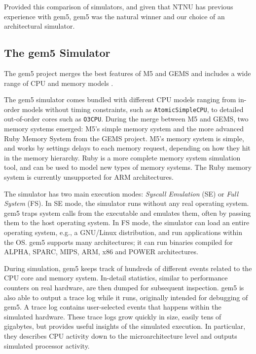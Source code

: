 Provided this comparison of simulators, and given that NTNU has previous
experience with gem5, gem5 was the natural winner and our choice of an
architectural simulator.


\subsection{The gem5 Simulator}

The gem5 project \cite{gem5} merges the best features of M5 \cite{binkert2006m5}
and GEMS \cite{GEMS} and includes a wide range of CPU and memory models
\cite{gem5hipeac}.

The gem5 simulator comes bundled with different CPU models ranging from in-order
models without timing constraints, such as \texttt{AtomicSimpleCPU}, to detailed
out-of-order cores such as \texttt{O3CPU}. During the merge between M5 and GEMS,
two memory systems emerged: M5's simple memory system and the more advanced Ruby
Memory System from the GEMS project. M5's memory system is simple, and works by
settings delays to each memory request, depending on how they hit in the memory
hierarchy. Ruby is a more complete memory system simulation tool, and can be
used to model new types of memory systems. The Ruby memory system is currently
unsupported for ARM architectures.

The simulator has two main execution modes: \textit{Syscall
Emulation} (SE) or \textit{Full System} (FS). In SE mode, the simulator runs
without any real operating system. gem5 traps system calls from the executable
and emulates them, often by passing them to the host operating system. In FS
mode, the simulator can load an entire operating system, e.g., a GNU/Linux
distribution, and run applications within the OS. gem5 supports many
architectures; it can run binaries compiled for ALPHA, SPARC, MIPS, ARM, x86 and
POWER architectures.

During simulation, gem5 keeps track of hundreds of different events related to
the CPU core and memory system. In-detail statistics, similar to performance
counters on real hardware, are then dumped for subsequent inspection. gem5 is
also able to output a trace log while it runs, originally intended for debugging
of gem5. A trace log contains user-selected events that happens within the
simulated hardware. These trace logs grow quickly in size, easily tens of
gigabytes, but provides useful insights of the simulated execution. In
particular, they describes CPU activity down to the microarchitecture level and
outputs simulated processor activity.

